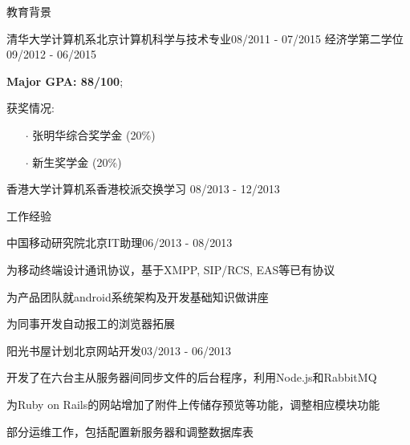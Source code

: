 \documentclass{resume} %
\begin{document}
\vspace{-1.5em}
\begin{rSection}{教育背景}
\begin{eSubsection}{清华大学计算机系}{北京}{计算机科学与技术专业}{08/2011 - 07/2015}
{经济学第二学位}{09/2012 - 06/2015}
\item \textbf{Major GPA: 88/100};
\item 获奖情况:
\begin{itemize}
\itemsep -0.5em \vspace{-0.5em}
\item[$\cdot$] 张明华综合奖学金 (20\%)
\item[$\cdot$] 新生奖学金 (20\%)
\end{itemize}
\end{eSubsection}
\vspace{-0.8em}
\begin{rSubsection}{香港大学计算机系}{香港}{校派交换学习}{ 08/2013 - 12/2013}
\end{rSubsection}
\end{rSection}
\vspace{-1.0em}

\begin{rSection}{工作经验}
\begin{rSubsection}{中国移动研究院}{北京}{IT助理}{06/2013 - 08/2013}
\vspace{-0.4em}
\item 为移动终端设计通讯协议，基于XMPP, SIP/RCS, EAS等已有协议
\item 为产品团队就android系统架构及开发基础知识做讲座
\item 为同事开发自动报工的浏览器拓展
\end{rSubsection}
\vspace{-0.8em}
\begin{rSubsection}{阳光书屋计划}{北京}{网站开发}{03/2013 - 06/2013}
\vspace{-0.4em}
\item 开发了在六台主从服务器间同步文件的后台程序，利用Node.js和RabbitMQ
\item 为Ruby on Rails的网站增加了附件上传储存预览等功能，调整相应模块功能
\item 部分运维工作，包括配置新服务器和调整数据库表
\end{rSubsection}
\end{rSection}
\vspace{-1.0em}
\end{document}
